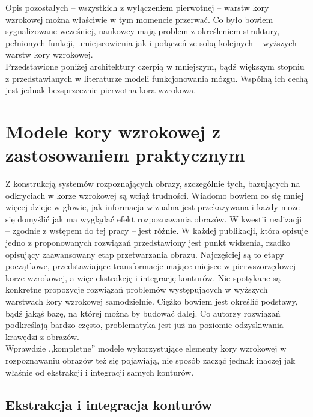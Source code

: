 Opis pozostałych -- wszystkich z wyłączeniem pierwotnej -- warstw kory wzrokowej można właściwie w tym momencie przerwać. Co było bowiem sygnalizowane wcześniej, naukowcy mają problem z określeniem struktury, pełnionych funkcji, umiejscowienia jak i połączeń ze sobą kolejnych -- wyższych warstw kory wzrokowej.\\

Przedstawione poniżej architektury czerpią w mniejszym, bądź większym stopniu z przedstawianych w literaturze modeli funkcjonowania mózgu. Wspólną ich cechą jest jednak bezsprzecznie pierwotna kora wzrokowa. 



\chapter{Modele kory wzrokowej z zastosowaniem praktycznym}
\label{praktyczneModeleKoryWzrokowej}

Z konstrukcją systemów rozpoznających obrazy, szczególnie tych, bazujących na odkryciach w korze wzrokowej są wciąż trudności. Wiadomo bowiem co się mniej więcej dzieje w głowie, jak informacja wizualna jest przekazywana i każdy może się domyślić jak ma wyglądać efekt rozpoznawania obrazów. W kwestii realizacji -- zgodnie z wstępem do tej pracy -- jest różnie. W każdej publikacji, która opisuje jedno z proponowanych rozwiązań przedstawiony jest punkt widzenia, rzadko opisujący zaawansowany etap przetwarzania obrazu. Najczęściej są to etapy początkowe, przedstawiające transformacje mające miejsce w pierwszorzędowej korze wzrokowej, a więc ekstrakcję i integrację konturów. Nie spotykane są konkretne propozycje rozwiązań problemów występujących w wyższych warstwach kory wzrokowej samodzielnie. Ciężko bowiem jest określić podstawy, bądź jakąś bazę, na której można by budować dalej. Co autorzy rozwiązań podkreślają bardzo często, problematyka jest już na poziomie odzyskiwania krawędzi z obrazów.\\

Wprawdzie ,,kompletne'' modele wykorzystujące elementy kory wzrokowej w rozpoznawaniu obrazów też się pojawiają, nie sposób zacząć jednak inaczej jak właśnie od ekstrakcji i integracji samych konturów.

\section{Ekstrakcja i integracja konturów}
\label{contourIntegration}

